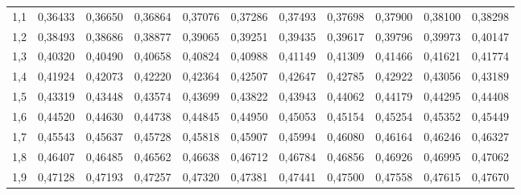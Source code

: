 \documentclass[14pt,aspectratio=1610]{beamer}
\begin{document}
\begin{frame}[fragile]{}
\begin{block}{}
\begin{center}
{\begin{tabular}{rrrrrrrrrrr}
  1,1 & 0,36433 & 0,36650 & 0,36864 & 0,37076 & 0,37286 & 0,37493 & 0,37698 & 0,37900 & 0,38100 & 0,38298 \\ 
  1,2 & 0,38493 & 0,38686 & 0,38877 & 0,39065 & 0,39251 & 0,39435 & 0,39617 & 0,39796 & 0,39973 & 0,40147 \\ 
  1,3 & 0,40320 & 0,40490 & 0,40658 & 0,40824 & 0,40988 & 0,41149 & 0,41309 & 0,41466 & 0,41621 & 0,41774 \\ 
  1,4 & 0,41924 & 0,42073 & 0,42220 & 0,42364 & 0,42507 & 0,42647 & 0,42785 & 0,42922 & 0,43056 & 0,43189 \\ 
  1,5 & 0,43319 & 0,43448 & 0,43574 & 0,43699 & 0,43822 & 0,43943 & 0,44062 & 0,44179 & 0,44295 & 0,44408 \\ 
  1,6 & 0,44520 & 0,44630 & 0,44738 & 0,44845 & 0,44950 & 0,45053 & 0,45154 & 0,45254 & 0,45352 & 0,45449 \\ 
  1,7 & 0,45543 & 0,45637 & 0,45728 & 0,45818 & 0,45907 & 0,45994 & 0,46080 & 0,46164 & 0,46246 & 0,46327 \\ 
  1,8 & 0,46407 & 0,46485 & 0,46562 & 0,46638 & 0,46712 & 0,46784 & 0,46856 & 0,46926 & 0,46995 & 0,47062 \\ 
  1,9 & 0,47128 & 0,47193 & 0,47257 & 0,47320 & 0,47381 & 0,47441 & 0,47500 & 0,47558 & 0,47615 & 0,47670 \\ 
   \hline
\end{tabular}}
\end{center}
\end{block}
\end{frame}
\end{document}
